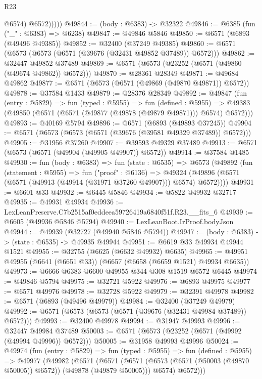 \begin{lexlean}{R23}
\begin{coremodule}
                @6574)
              @6572)))))
@49844 := (body : @6383) -> @32322
@49846 := @6385 (fun ("_" : @6383) => @6238)
@49847 := @49846 @5846
@49850 := @6571 (@6893 (@49496 @49385))
@49852 := @32400 (@37249 @49385)
@49860 := @6571 (@6573 (@6573 (@6571 (@39676 (@32431 @49852 @37489)) @6572)))
@49862 := @32447 @49852 @37489
@49869 := @6571 (@6573 (@23252 (@6571 (@49860 (@49674 @49862)) @6572)))
@49870 := @28361 @28349
@49871 := @49684 @49862
@49877 := @6571 (@6573 (@6571 (@49869 (@49870 @49871)) @6572))
@49878 := @37584 @1433
@49879 := @28376 @28349
@49892 := @49847
    (fun (entry : @5829) =>
    fun (typed : @5955) =>
    fun (defined : @5955) =>
    @49383 (@49850 (@6571 (@6571 (@49877 (@49878 (@49879 @49871))) @6574) @6572)))
@49893 := @40169 @5794
@49896 := @6571 (@6893 (@49893 @37245))
@49904 := @6571 (@6573 (@6573 (@6571 (@39676 (@39581 @49329 @37489)) @6572)))
@49905 := @31956 @37260
@49907 := @39593 @49329 @37489
@49913 := @6571 (@6573 (@6571 (@49904 (@49905 @49907)) @6572))
@49914 := @37584 @1485
@49930 := fun (body : @6383) =>
  fun (state : @6535) =>
  @6573
    (@49892
      (fun (statement : @5955) =>
      fun ("proof" : @6136) =>
      @49324 (@49896 (@6571 (@6571 (@49913 (@49914 (@31971 @37260 @49907))) @6574) @6572))))
@49931 := @6601 @33
@49932 := @6445 @5846
@49934 := @5822 @49932 @32717
@49935 := @49931 @49934
@49936 := LexLeanPreserve.C7b2515af0eddeea59726419a6840f51f.R23.__fits_6
@49939 := @6605 (@49936 @5846 @5794)
@49940 := LexLeanBoot.IrProof.bodyJson
@49944 := @49939 (@32727 (@49940 @5846 @5794))
@49947 := (body : @6383) -> (state : @6535) -> @49935 @49944
@49951 := @6619 @33 @49934 @49944 @1521
@49955 := @32755 (@6625 (@6632 @49932) @6635)
@49965 := @49951 @49955 (@6641 (@6651 @33)) (@6657 (@6658 (@6659 @1521) @49934 @6635))
@49973 := @6666 @6383 @6600 @49955 @344 @308 @1519 @6572 @6445
@49974 := @49846 @5794
@49975 := @32721 @5922
@49976 := @6893 @49975
@49977 := @6571 @49976
@49978 := @32728 @5922
@49979 := @32391 @49978
@49982 := @6571 (@6893 (@49496 @49979))
@49984 := @32400 (@37249 @49979)
@49992 := @6571 (@6573 (@6573 (@6571 (@39676 (@32431 @49984 @37489)) @6572)))
@49993 := @32400 @49978
@49994 := @31947 @49993
@49996 := @32447 @49984 @37489
@50003 := @6571 (@6573 (@23252 (@6571 (@49992 (@49994 @49996)) @6572)))
@50005 := @31958 @49993 @49996
@50024 := @49974
    (fun (entry : @5829) =>
    fun (typed : @5955) =>
    fun (defined : @5955) =>
    @49977
      (@49982
        (@6571
          (@6571
            (@6571 (@6573 (@6571 (@50003 (@49870 @50005)) @6572)) (@49878 (@49879 @50005)))
            @6574)
          @6572)))

\end{coremodule}
\end{lexlean}
